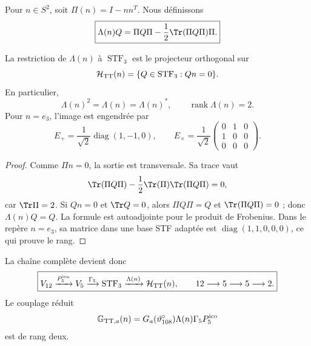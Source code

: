 Pour \(n\in S^2\), soit \(\Pi(n)=I-nn^T\). Nous définissons
\begin{equation}
\label{ii:ii:pent:eq:gravity-lambda-tt}
\boxed{
\Lambda(n)Q
=\Pi Q\Pi-\frac12\Tr(\Pi Q\Pi)\Pi.}
\end{equation}

\begin{theorem}
\label{ii:ii:pent:thm:gravity-tt}
La restriction de \(\Lambda(n)\) à \(\operatorname{STF}_3\) est le
projecteur orthogonal sur
\begin{equation}
\label{ii:ii:pent:eq:gravity-htt}
\mathcal H_{\rm TT}(n)
=\{Q\in\operatorname{STF}_3:Qn=0\}.
\end{equation}
En particulier,
\begin{equation}
\label{ii:ii:pent:eq:gravity-lambda-properties}
\Lambda(n)^2=\Lambda(n)=\Lambda(n)^*,
\qquad \operatorname{rank}\Lambda(n)=2.
\end{equation}
Pour \(n=e_3\), l’image est engendrée par
\begin{equation}
\label{ii:ii:pent:eq:gravity-plus-cross}
E_+=\frac1{\sqrt2}\operatorname{diag}(1,-1,0),
\qquad
E_\times=\frac1{\sqrt2}
\begin{pmatrix}0&1&0\\1&0&0\\0&0&0\end{pmatrix}.
\end{equation}
\end{theorem}

\begin{proof}
Comme \(\Pi n=0\), la sortie est transversale. Sa trace vaut
\[
\Tr(\Pi Q\Pi)-\frac12\Tr(\Pi)\Tr(\Pi Q\Pi)=0,
\]
car \(\Tr\Pi=2\). Si \(Qn=0\) et \(\Tr Q=0\), alors
\(\Pi Q\Pi=Q\) et \(\Tr(\Pi Q\Pi)=0\) ; donc
\(\Lambda(n)Q=Q\). La formule est autoadjointe pour le produit de
Frobenius. Dans le repère \(n=e_3\), sa matrice dans une base STF adaptée est
\(\operatorname{diag}(1,1,0,0,0)\), ce qui prouve le rang.
\end{proof}

La chaîne complète devient donc
\begin{equation}
\label{ii:ii:pent:eq:gravity-12-5-5-2}
\boxed{
V_{12}\xrightarrow{P^{\mathrm{ico}}_5}V_5
\xrightarrow{\Gamma_5}\operatorname{STF}_3
\xrightarrow{\Lambda(n)}\mathcal H_{\rm TT}(n),
\qquad 12\longrightarrow5\longrightarrow5\longrightarrow2.}
\end{equation}
Le couplage réduit
\begin{equation}
\label{ii:ii:pent:eq:gravity-effective-map}
\mathbb G_{{\rm TT},a}(n)
=G_a(\vartheta^\circ_{108})\Lambda(n)\Gamma_5P^{\mathrm{ico}}_5
\end{equation}
est de rang deux.

